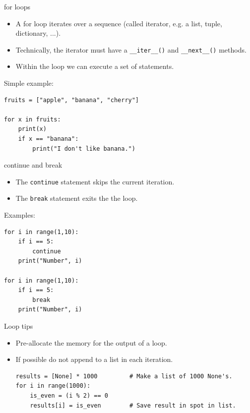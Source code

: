 \documentclass[compress%
,aspectratio=169%
]{beamer}
\newcommand{\code}{\lstinline}
\begin{document}
\begin{frame}[fragile]{for loops}

\begin{itemize}
    \item A for loop iterates over a sequence (called iterator, e.g. a list, tuple, dictionary, ...).
    \item Technically, the iterator must have a \lstinline{__iter__()} and \lstinline{__next__()} methods.
    \item Within the loop we can execute a set of statements.
\end{itemize}

Simple example:
\begin{lstlisting}
fruits = ["apple", "banana", "cherry"]

for x in fruits:
    print(x)
    if x == "banana":
        print("I don't like banana.")
\end{lstlisting}

\end{frame}

\begin{frame}[fragile]{continue and break}

\begin{itemize}
    \item The \code|continue| statement skips the current iteration.
    \item The \code|break| statement exits the the loop.
\end{itemize}

Examples:
\begin{lstlisting}
for i in range(1,10):
    if i == 5:
        continue
    print("Number", i)

for i in range(1,10):
    if i == 5:
        break
    print("Number", i)
\end{lstlisting}

\end{frame}

\begin{frame}[fragile]{Loop tips}
\begin{itemize}
\small
    \item Pre-allocate the memory for the output of a loop. 
    \item If possible \alert{do not append to a list} in each iteration.
\begin{lstlisting}
results = [None] * 1000         # Make a list of 1000 None's.
for i in range(1000):
    is_even = (i % 2) == 0
    results[i] = is_even        # Save result in spot in list.
\end{lstlisting}
\end{itemize}
\end{frame}
\end{document}
